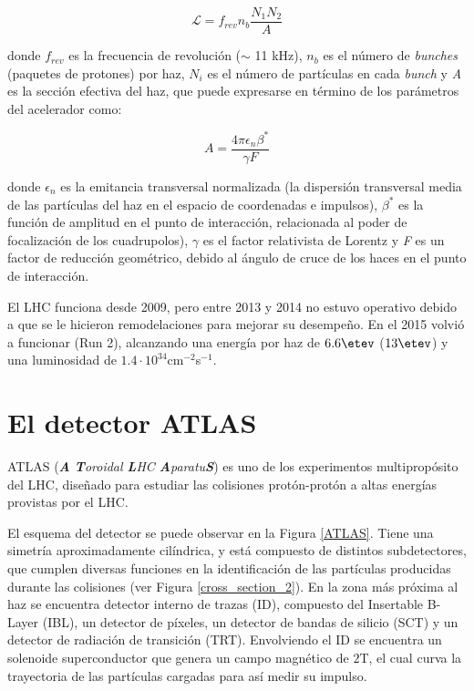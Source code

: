 \begin{equation}
\mathcal{L}=f_{rev}n_{b}\frac{N_{1}N_{2}}{A}
\end{equation}

donde $f_{rev}$ es la frecuencia de revolución ($\sim$ 11 kHz), $n_{b}$ es el número de \textit{bunches} (paquetes de protones) por haz, $N_{i}$ es el número de partículas en cada \textit{bunch} y \textit{A} es la sección efectiva del haz, que puede expresarse en término de los parámetros del acelerador como:

\begin{equation}
A=\frac{4 \pi \epsilon_{n}\beta^{*}}{\gamma F}
\end{equation}

donde $\epsilon_{n}$ es la emitancia transversal normalizada (la dispersión transversal media de las partículas del  haz en el espacio de coordenadas e impulsos), $\beta^{*}$ es la función de amplitud en el punto de interacción, relacionada al poder de focalización de los cuadrupolos), $\gamma$ es el factor relativista de Lorentz y \textit{F} es un factor de reducción geométrico, debido al ángulo de cruce de los haces en el punto de interacción.


El LHC funciona desde 2009, pero entre 2013 y 2014 no estuvo operativo debido a que se le hicieron remodelaciones para mejorar su desempeño. En el 2015 volvió a funcionar (Run 2), alcanzando una energía por haz de $6.6 \etev$ ($13 \etev$) y una luminosidad de $1.4\cdot 10^{34}$cm$^{-2}$s$^{-1}$.

\section{El detector ATLAS}

ATLAS (\textit{\textbf{A} \textbf{T}oroidal \textbf{L}HC \textbf{A}paratu\textbf{S}})  \cite{PERF-2007-01} es uno de los experimentos multipropósito del LHC, diseñado para estudiar las colisiones protón-protón a altas energías provistas por el LHC.

El esquema del detector se puede observar en la Figura \ref{ATLAS}. Tiene una simetría aproximadamente cilíndrica, y está compuesto de distintos subdetectores, que cumplen diversas funciones en la identificación de las partículas producidas durante las colisiones (ver Figura \ref{cross_section_2}). En la zona más próxima al haz se encuentra detector interno de trazas (ID), compuesto del Insertable B-Layer (IBL), un detector de píxeles, un detector de bandas de silicio (SCT) y un detector de radiación de transición (TRT). Envolviendo el ID se encuentra un solenoide superconductor que genera un campo magnético de $2$T, el cual curva la trayectoria de las partículas cargadas para así medir su impulso.

